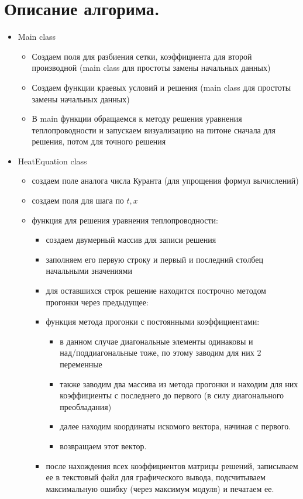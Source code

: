 \documentclass[12pt,a4paper]{scrartcl}
\begin{document}
\section{Описание алгорима.}
\begin{itemize}
    \item Main class 
    \begin{itemize}
        \item Создаем поля для разбиения сетки, коэффициента для
        второй производной (main class для простоты замены начальных
        данных)
        \item Создаем функции краевых условий и решения (main class
        для простоты замены начальных данных)
        \item В main функции обращаемся к методу решения уравнения
        теплопроводности и запускаем визуализацию на питоне сначала
        для
        решения, потом для точного решения
    \end{itemize}
    \item HeatEquation class
    \begin{itemize}
        \item создаем поле аналога числа Куранта (для упрощения
        формул
        вычислений)
        \item создаем поля для шага по $t,x$  
        \item функция для решения уравнения теплопроводности:
        \begin{itemize}
            \item создаем двумерный массив для записи решения 
            \item заполняем его первую строку и первый и последний 
            столбец начальными значениями
            \item для оставшихся строк решение находится построчно 
            методом прогонки через предыдущее:
            \item функция метода прогонки с постоянными
            коэффициентами:
            \begin{itemize}
                \item в данном случае диагональные элементы одинаковы
                и \\
                над/поддиагональные тоже, по этому заводим для них
                2 переменные
                \item также заводим два массива из метода прогонки и 
                находим для них коэффициенты с последнего до первого
                (в силу диагонального преобладания)
                \item далее находим координаты искомого вектора, начиная с первого.
                \item возвращаем этот вектор.
            \end{itemize}
            \item после нахождения всех коэффициентов матрицы
            решений, записываем ее в текстовый файл для графического
            вывода, подсчитываем максимальную ошибку (через
            максимум модуля) и печатаем ее.
        \end{itemize}
    \end{itemize}
\end{itemize}
\end{document}
